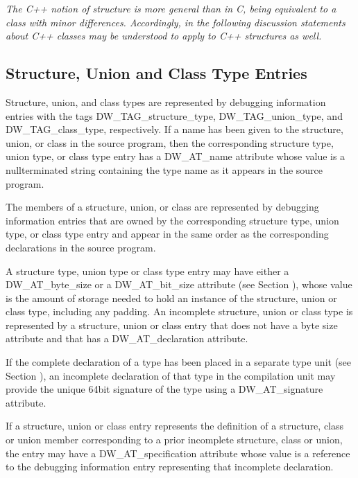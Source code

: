 \textit{The C++ notion of structure is more general than in C, being
equivalent to a class with minor differences. Accordingly,
in the following discussion statements about C++ classes may
be understood to apply to C++ structures as well.}

\subsection{Structure, Union and Class Type Entries}
\label{chap:structureunionandclasstypeentries}


Structure, union, and class types are represented by debugging
information entries with the tags DW\_TAG\_structure\_type,
DW\_TAG\_union\_type, and DW\_TAG\_class\_type,
respectively. If a name has been given to the structure,
union, or class in the source program, then the corresponding
structure type, union type, or class type entry has a
DW\_AT\_name attribute whose value is a null\dash terminated string
containing the type name as it appears in the source program.

The members of a structure, union, or class are represented
by debugging information entries that are owned by the
corresponding structure type, union type, or class type entry
and appear in the same order as the corresponding declarations
in the source program.

A structure type, union type or class type entry may have
either a DW\_AT\_byte\_size or a DW\_AT\_bit\_size attribute 
(see Section ), 
whose value is the amount of storage needed
to hold an instance of the structure, union or class type,
including any padding.  An incomplete structure, union or
class type is represented by a structure, union or class
entry that does not have a byte size attribute and that has
a DW\_AT\_declaration attribute.

If the complete declaration of a type has been placed in
a separate type unit 
(see Section ), 
an incomplete
declaration of that type in the compilation unit may provide
the unique 64\dash bit signature of the type using a DW\_AT\_signature
attribute.

If a structure, union or class entry represents the definition
of a structure, class or union member corresponding to a prior
incomplete structure, class or union, the entry may have a
DW\_AT\_specification attribute whose value is a reference to
the debugging information entry representing that incomplete
declaration.

